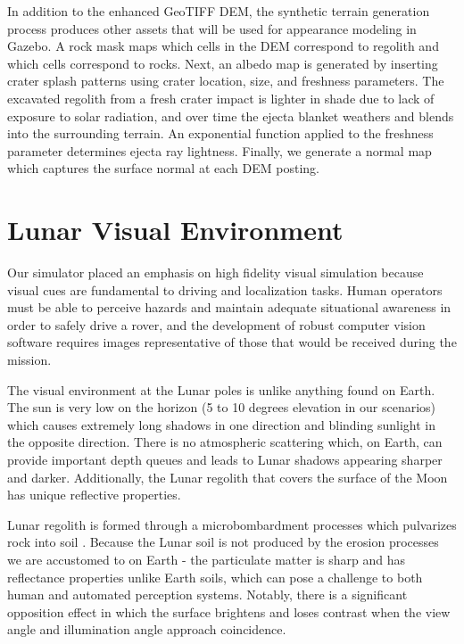 \documentclass[twocolumn,letterpaper]{IEEEAerospaceCLS}  %
\begin{document}
In addition to the enhanced GeoTIFF DEM, the synthetic terrain generation process produces other assets that will be used for appearance modeling in Gazebo.  
A rock mask maps which cells in the DEM correspond to regolith and which cells correspond to rocks.  
Next, an albedo map is generated by inserting crater splash patterns using crater location, size, and freshness parameters.  
The excavated regolith from a fresh crater impact is lighter in shade due to lack of exposure to solar radiation, and over time the ejecta blanket weathers and blends into the surrounding terrain.  
An exponential function applied to the freshness parameter determines ejecta ray lightness.  
Finally, we generate a normal map which captures the surface normal at each DEM posting.  

\section{Lunar Visual Environment}
\label{sec:visual-env}

Our simulator placed an emphasis on high fidelity visual simulation because visual cues are fundamental to driving and localization tasks.  
Human operators must be able to perceive hazards and maintain adequate situational awareness in order to safely drive a rover, and the development of robust computer vision software requires images representative of those that would be received during the mission.  

The visual environment at the Lunar poles is unlike anything found on Earth.  
The sun is very low on the horizon (5 to 10 degrees elevation in our scenarios) which causes extremely long shadows in one direction and blinding sunlight in the opposite direction.  
There is no atmospheric scattering which, on Earth, can provide important depth queues \cite{fry1949effects} and leads to Lunar shadows appearing sharper and darker.
Additionally, the Lunar regolith that covers the surface of the Moon has unique reflective properties.  

Lunar regolith is formed through a microbombardment processes which pulvarizes rock into soil \cite{lunarsourcebook}.  Because the Lunar soil is not produced by the erosion processes we are accustomed to on Earth - the particulate matter is sharp and has reflectance properties unlike Earth soils, which can pose a challenge to both human and automated perception systems.  
Notably, there is a significant opposition effect \cite{hapke1986bidirectional} in which the surface brightens and loses contrast when the view angle and illumination angle approach coincidence.
\end{document}
